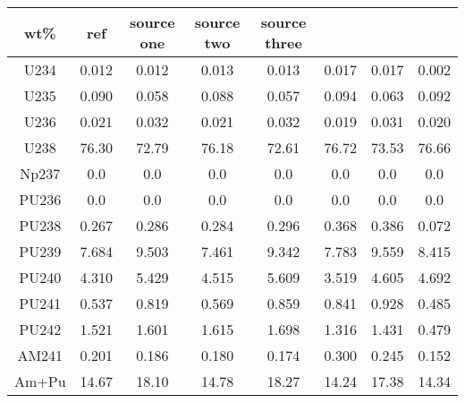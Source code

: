 	\begin{tabular}{cccccccc}
		\hline
		\textbf{wt\%} & \textbf{ref} & \textbf{source one} & \textbf{source two} & \textbf{source three} \\ 
		\hline
		U234 & 0.012 & 0.012 & 0.013 & 0.013 & 0.017 & 0.017 & 0.002 \\ 
		U235 & 0.090 & 0.058 & 0.088 & 0.057 & 0.094 & 0.063 & 0.092 \\ 
		U236 & 0.021 & 0.032 & 0.021 & 0.032 & 0.019 & 0.031 & 0.020 \\ 
		U238 & 76.30 & 72.79 & 76.18 & 72.61 & 76.72 & 73.53 & 76.66 \\ 
		Np237 & 0.0 & 0.0 & 0.0 & 0.0 & 0.0 & 0.0 & 0.0 \\ 
		PU236 & 0.0 & 0.0 & 0.0 & 0.0 & 0.0 & 0.0 & 0.0 \\ 
		PU238 & 0.267 & 0.286 & 0.284 & 0.296 & 0.368 & 0.386 & 0.072 \\ 
		PU239 & 7.684 & 9.503 & 7.461 & 9.342 & 7.783 & 9.559 & 8.415 \\ 
		PU240 & 4.310 & 5.429 & 4.515 & 5.609 & 3.519 & 4.605 & 4.692 \\ 
		PU241 & 0.537 & 0.819 & 0.569 & 0.859 & 0.841 & 0.928 & 0.485 \\ 
		PU242 & 1.521 & 1.601 & 1.615 & 1.698 & 1.316 & 1.431 & 0.479 \\ 
		AM241 & 0.201 & 0.186 & 0.180 & 0.174 & 0.300 & 0.245 & 0.152 \\ 
		Am+Pu & 14.67 & 18.10 & 14.78 & 18.27 & 14.24 & 17.38 & 14.34 \\ 
		\hline 
	\end{tabular} 
